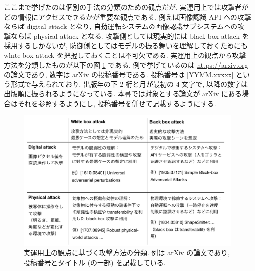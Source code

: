 ここまで挙げたのは個別の手法の分類のための観点だが, 実運用上では攻撃者がどの情報にアクセスできるかが重要な観点である.
例えば画像認識 API への攻撃ならば digital attack となり, 自動運転システムの画像認識サブシステムへの攻撃ならば physical attack となる.
攻撃側としては現実的には black box attack を採用するしかないが, 防御側としてはモデルの振る舞いを理解しておくためにも white box attack を把握しておくことは不可欠である.
実運用上の観点から攻撃方法を分類したものが以下の図 \ref{fig:attack-summary} である.
例で挙げているのは \href{https://arxiv.org}{https://arxiv.org} の論文であり, 数字は arXiv の投稿番号である.
投稿番号は [YYMM.xxxxx] という形式で与えられており, 出版年の下 2 桁と月が最初の 4 文字で, 以降の数字は出版順に振られるようになっている.
本書では対象とする論文が arXiv にある場合はそれを参照するようにし, 投稿番号を併せて記載するようにする.
%
\begin{figure}[htbp]
\begin{center}
\includegraphics[width=15.0cm]{figures/attack-summary.pdf}
\end{center}
\caption{実運用上の観点に基づく攻撃方法の分類. 例は arXiv の論文であり, 投稿番号とタイトル (の一部) を記載している.}
\label{fig:attack-summary}
\end{figure}
%



